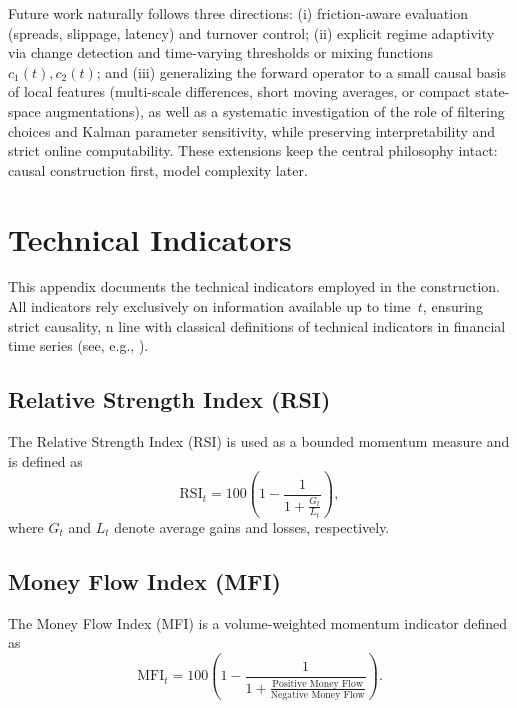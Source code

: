 \documentclass[final,5p,times,twocolumn]{elsarticle}
\begin{document}
Future work naturally follows three directions: (i) friction-aware evaluation (spreads, slippage, latency) and turnover control; 
(ii) explicit regime adaptivity via change detection and time-varying thresholds or mixing functions $c_1(t),c_2(t)$; and 
(iii) generalizing the forward operator to a small causal basis of local features (multi-scale differences, short moving averages, or compact state-space augmentations), as well as a systematic investigation of the role of filtering choices and Kalman parameter sensitivity, while preserving interpretability and strict online computability.
These extensions keep the central philosophy intact: causal construction first, model complexity later.

 
 
%   




\appendix

\section{Technical Indicators}
\label{app:indicators}

This appendix documents the technical indicators employed in the construction.
All indicators rely exclusively on information available up to time~$t$, ensuring strict causality, n line with classical definitions of technical indicators in financial time series (see, e.g., \cite{murphy1999technical}).

\subsection{Relative Strength Index (RSI)}
The Relative Strength Index (RSI) is used as a bounded momentum measure and is defined \cite{wilder1978} as 
\begin{equation}
\text{RSI}_t = 100 \left( 1 - \frac{1}{1 + \frac{G_t}{L_t}} \right),
\end{equation}
where $G_t$ and $L_t$ denote average gains and losses, respectively.

\subsection{Money Flow Index (MFI)}
The Money Flow Index (MFI) is a volume-weighted momentum indicator defined as
\begin{equation}
\text{MFI}_t = 100 \left( 1 - \frac{1}{1 + \frac{\text{Positive Money Flow}}{\text{Negative Money Flow}}} \right).
\end{equation}
\end{document}
